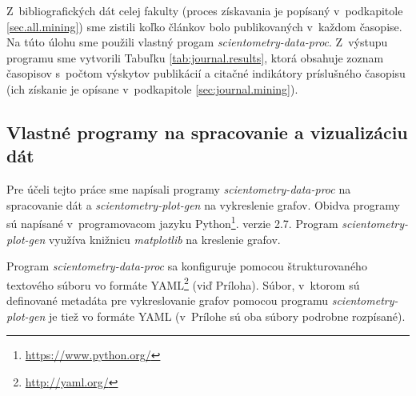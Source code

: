 Z~bibliografických dát celej fakulty (proces získavania je popísaný
v~podkapitole \ref{sec.all.mining}) sme zistili koľko článkov bolo
publikovaných v~každom časopise.  Na túto úlohu sme použili vlastný progam
\emph{scientometry-data-proc}. Z~výstupu programu sme vytvorili  Tabuľku
\ref{tab:journal.results}, ktorá obsahuje zoznam časopisov s~počtom výskytov
publikácií a citačné indikátory príslušného časopisu (ich získanie je opísane
v~podkapitole \ref{sec:journal.mining}). 

\subsection{Vlastné programy na spracovanie a vizualizáciu dát}
\label{sec:program.my}

Pre účeli tejto práce sme napísali programy \emph{scientometry-data-proc} na
spracovanie dát a \emph{scientometry-plot-gen} na vykreslenie grafov.  Obidva
programy sú napísané v~programovacom jazyku
Python\footnote{\url{https://www.python.org/}}. verzie 2.7. 
Program \emph{scientometry-plot-gen} využíva knižnicu \emph{matplotlib} na kreslenie
grafov.

Program \emph{scientometry-data-proc} sa konfiguruje pomocou štrukturovaného
textového súboru vo formáte YAML\footnote{\url{http://yaml.org/}} (viď
Príloha). Súbor, v~ktorom sú definované metadáta pre vykreslovanie grafov
pomocou programu \emph{scientometry-plot-gen} je tiež vo formáte YAML
(v~Prílohe sú oba súbory podrobne rozpísané).  


